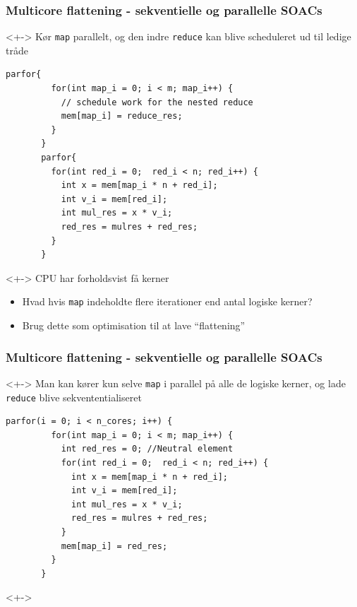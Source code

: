 \documentclass[t]{beamer}
\begin{document}
\begin{frame}[fragile]
  \frametitle{Multicore flattening - sekventielle og parallelle SOACs}
  \begin{onlyenv}<+->
    Kør \texttt{map} parallelt, og den indre \texttt{reduce} kan blive scheduleret ud til ledige tråde
\begin{lstlisting}[language=ispc, xleftmargin=-15mm]
       parfor{
         for(int map_i = 0; i < m; map_i++) {
           // schedule work for the nested reduce
           mem[map_i] = reduce_res;
         }
       }
       parfor{
         for(int red_i = 0;  red_i < n; red_i++) {
           int x = mem[map_i * n + red_i];
           int v_i = mem[red_i];
           int mul_res = x * v_i;
           red_res = mulres + red_res;
         }
       }
\end{lstlisting}
  \end{onlyenv}
  \begin{onlyenv}<+->
    CPU har forholdsvist få kerner
    \begin{itemize}
      \item<+-> Hvad hvis \texttt{map} indeholdte flere iterationer end antal logiske kerner?
      \item<+-> Brug dette som optimisation til at lave ``flattening''
    \end{itemize}
  \end{onlyenv}
\end{frame}

\begin{frame}[fragile]
  \frametitle{Multicore flattening - sekventielle og parallelle SOACs}
  \begin{onlyenv}<+->
    Man kan kører kun selve \texttt{map} i parallel på alle de logiske kerner, og lade \texttt{reduce} blive sekvententialiseret
\begin{lstlisting}[language=ispc, xleftmargin=-15mm]
       parfor(i = 0; i < n_cores; i++) {
         for(int map_i = 0; i < m; map_i++) {
           int red_res = 0; //Neutral element
           for(int red_i = 0;  red_i < n; red_i++) {
             int x = mem[map_i * n + red_i];
             int v_i = mem[red_i];
             int mul_res = x * v_i;
             red_res = mulres + red_res;
           }
           mem[map_i] = red_res;
         }
       }
\end{lstlisting}
  \end{onlyenv}
  <+->
\end{frame}
\end{document}
